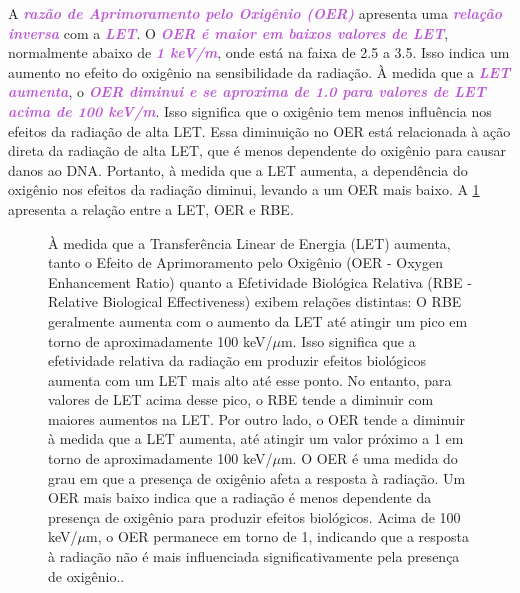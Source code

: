\documentclass[11pt,a4paper]{article}
\begin{document}
	A \textcolor{MediumOrchid}{\textbf{\textit{razão de Aprimoramento pelo Oxigênio (OER)}}} apresenta uma \textcolor{MediumOrchid}{\textbf{\textit{relação inversa}}} com a \textcolor{MediumOrchid}{\textbf{\textit{LET}}}. O \textcolor{MediumOrchid}{\textbf{\textit{OER é maior em baixos valores de LET}}}, normalmente abaixo de \textcolor{MediumOrchid}{\textbf{\textit{1 keV/\mu m}}}, onde está na faixa de 2.5 a 3.5. Isso indica um aumento no efeito do oxigênio na sensibilidade da radiação. À medida que a \textcolor{MediumOrchid}{\textbf{\textit{LET aumenta}}}, o \textcolor{MediumOrchid}{\textbf{\textit{OER diminui e se aproxima de 1.0 para valores de LET acima de 100 keV/\mu m}}}. Isso significa que o oxigênio tem menos influência nos efeitos da radiação de alta LET. Essa diminuição no OER está relacionada à ação direta da radiação de alta LET, que é menos dependente do oxigênio para causar danos ao DNA. Portanto, à medida que a LET aumenta, a dependência do oxigênio nos efeitos da radiação diminui, levando a um OER mais baixo. A \ref{fig:OerERbe} apresenta a relação entre a LET, OER e RBE.

	\begin{figure}[h]
		\centering
		\caption{À medida que a Transferência Linear de Energia (LET) aumenta, tanto o Efeito de Aprimoramento pelo Oxigênio (OER - Oxygen Enhancement Ratio) quanto a Efetividade Biológica Relativa (RBE - Relative Biological Effectiveness) exibem relações distintas: O RBE geralmente aumenta com o aumento da LET até atingir um pico em torno de aproximadamente 100 keV/$\mu$m. Isso significa que a efetividade relativa da radiação em produzir efeitos biológicos aumenta com um LET mais alto até esse ponto. No entanto, para valores de LET acima desse pico, o RBE tende a diminuir com maiores aumentos na LET. Por outro lado, o OER tende a diminuir à medida que a LET aumenta, até atingir um valor próximo a 1 em torno de aproximadamente 100 keV/$\mu$m. O OER é uma medida do grau em que a presença de oxigênio afeta a resposta à radiação. Um OER mais baixo indica que a radiação é menos dependente da presença de oxigênio para produzir efeitos biológicos. Acima de 100 keV/$\mu$m, o OER permanece em torno de 1, indicando que a resposta à radiação não é mais influenciada significativamente pela presença de oxigênio..}
		\label{fig:OerERbe}
	\end{figure}
\end{document}
